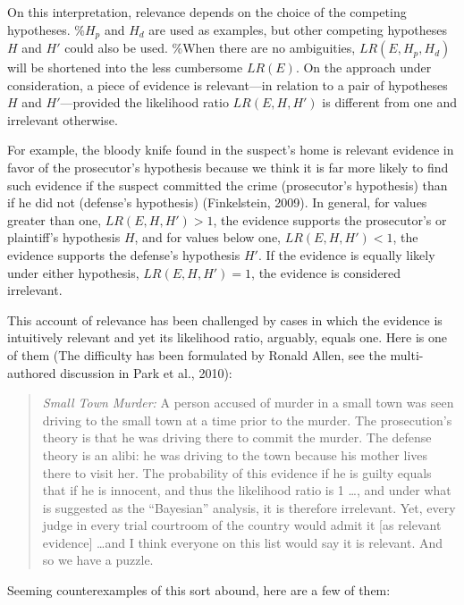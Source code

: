 \documentclass[10pt,dvipsnames,enabledeprecatedfontcommands]{scrartcl}
\begin{document}
On this interpretation, relevance depends on the choice of the competing
hypotheses. \%\(H_p\) and \(H_d\) are used as examples, but other
competing hypotheses \(H\) and \(H'\) could also be used. \%When there
are no ambiguities, \(LR(E, H_p, H_d)\) will be shortened into the less
cumbersome \(LR(E)\). On the approach under consideration, a piece of
evidence is relevant---in relation to a pair of hypotheses \(H\) and
\(H'\)---provided the likelihood ratio \(LR(E, H, H')\) is different
from one and irrelevant otherwise.

For example, the bloody knife found in the suspect's home is relevant
evidence in favor of the prosecutor's hypothesis because we think it is
far more likely to find such evidence if the suspect committed the crime
(prosecutor's hypothesis) than if he did not (defense's hypothesis)
(Finkelstein, 2009). In general, for values greater than one,
\(LR(E, H, H')>1\), the evidence supports the prosecutor's or
plaintiff's hypothesis \(H\), and for values below one,
\(LR(E, H, H')<1\), the evidence supports the defense's hypothesis
\(H'\). If the evidence is equally likely under either hypothesis,
\(LR(E, H, H')=1\), the evidence is considered irrelevant.

This account of relevance has been challenged by cases in which the
evidence is intuitively relevant and yet its likelihood ratio, arguably,
equals one. Here is one of them (The difficulty has been formulated by
Ronald Allen, see the multi-authored discussion in Park et al., 2010):

\begin{quote}
    \emph{Small Town Murder:} A person accused of murder in a small town was seen driving to the small town at a time prior to the murder. The prosecution's theory is that he was driving there to commit the murder. The defense theory is an alibi: he was driving to the town because his mother lives there to visit her. The probability of this evidence if he is guilty equals that if he is innocent, and thus the likelihood ratio is 1 \dots , and under what is suggested as the ``Bayesian'' analysis, it is therefore irrelevant. 
    Yet, every judge in every trial courtroom of the country would admit it [as relevant evidence] \dots and I think everyone on this list would say it is relevant.  And so we have a puzzle.  
    \end{quote}

\noindent  Seeming counterexamples of this sort abound, here are a few
of them:
\end{document}
